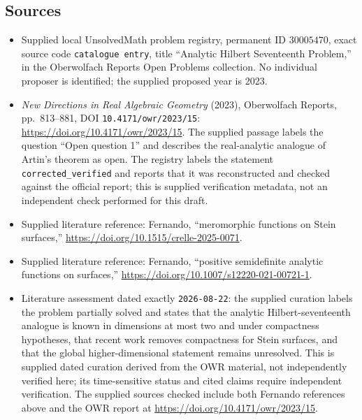 \documentclass[11pt]{article}
\begin{document}
\subsection{Sources}
\begin{itemize}
\item Supplied local UnsolvedMath problem registry, permanent ID \(30005470\), exact source code \texttt{catalogue entry}, title ``Analytic Hilbert Seventeenth Problem,'' in the Oberwolfach Reports Open Problems collection. No individual proposer is identified; the supplied proposed year is 2023.
\item \emph{New Directions in Real Algebraic Geometry} (2023), Oberwolfach Reports, pp.\ 813--881, DOI \texttt{10.4171/owr/2023/15}: \url{https://doi.org/10.4171/owr/2023/15}. The supplied passage labels the question ``Open question 1'' and describes the real-analytic analogue of Artin's theorem as open. The registry labels the statement \texttt{corrected\_verified} and reports that it was reconstructed and checked against the official report; this is supplied verification metadata, not an independent check performed for this draft.
\item Supplied literature reference: Fernando, ``meromorphic functions on Stein surfaces,'' \url{https://doi.org/10.1515/crelle-2025-0071}.
\item Supplied literature reference: Fernando, ``positive semidefinite analytic functions on surfaces,'' \url{https://doi.org/10.1007/s12220-021-00721-1}.
\item Literature assessment dated exactly \texttt{2026-08-22}: the supplied curation labels the problem partially solved and states that the analytic Hilbert-seventeenth analogue is known in dimensions at most two and under compactness hypotheses, that recent work removes compactness for Stein surfaces, and that the global higher-dimensional statement remains unresolved. This is supplied dated curation derived from the OWR material, not independently verified here; its time-sensitive status and cited claims require independent verification. The supplied sources checked include both Fernando references above and the OWR report at \url{https://doi.org/10.4171/owr/2023/15}.
\end{itemize}
\end{document}
